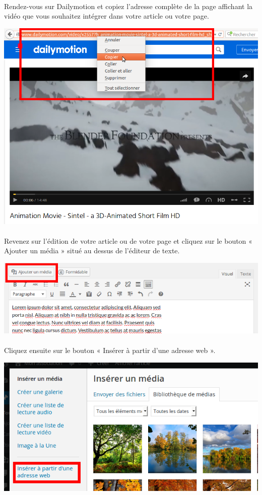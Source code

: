 \documentclass[10pt,a4paper]{article}
\begin{document}
\paragraph{}Rendez-vous sur Dailymotion et copiez l'adresse complète de la page affichant la vidéo que vous souhaitez intégrer dans votre article ou votre page.
\begin{center}
\includegraphics[scale=0.3]{img/0137.png}
\end{center}
\paragraph{}Revenez sur l'édition de votre article ou de votre page et cliquez sur le bouton « Ajouter un média » situé au dessus de l'éditeur de texte.
\begin{center}
\includegraphics[scale=0.3]{img/0102.png}
\end{center}
\paragraph{}Cliquez ensuite sur le bouton « Insérer à partir d'une adresse web ».
\begin{center}
\includegraphics[scale=0.3]{img/0133.png}
\end{center}
\newpage
\end{document}
